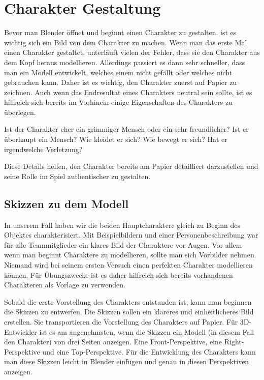 \section{Charakter Gestaltung}
Bevor man Blender öffnet und beginnt einen Charakter zu gestalten, ist es wichtig sich ein Bild von
dem Charakter zu machen. Wenn man das erste Mal einen Charakter gestaltet, unterläuft vielen der
Fehler, dass sie den Charakter aus dem Kopf heraus modellieren. Allerdings passiert es dann sehr
schneller, dass man ein Modell entwickelt, welches einem nicht gefällt oder welches nicht
gebrauchen kann. Daher ist es wichtig, den Charakter zuerst auf Papier zu zeichnen. Auch wenn das
Endresultat eines Charakters neutral sein sollte, ist es hilfreich sich bereits im Vorhinein einige
Eigenschaften des Charakters zu überlegen.

Ist der Charakter eher ein grimmiger Mensch oder ein sehr freundlicher? Ist er überhaupt ein
Mensch? Wie kleidet er sich? Wie bewegt er sich? Hat er irgendwelche Verletzung?

Diese Details helfen, den Charakter bereits am Papier detailliert darzustellen und seine Rolle im Spiel
authentischer zu gestalten.

\subsection{Skizzen zu dem Modell}

In unserem Fall haben wir die beiden Hauptcharaktere gleich zu Beginn des Objektes charakterisiert.
Mit Beispielbildern und einer Personenbeschreibung war für alle Teammitglieder ein klares Bild der
Charaktere vor Augen. Vor allem wenn man beginnt Charaktere zu modellieren, sollte man sich
Vorbilder nehmen. Niemand wird bei seinem ersten Versuch einen perfekten Charakter modellieren
können. Für Übungszwecke ist es daher hilfreich sich bereits vorhandenen Charakteren als Vorlage
zu verwenden.

Sobald die erste Vorstellung des Charakters entstanden ist, kann man beginnen die Skizzen zu
entwerfen. Die Skizzen sollen ein klareres und einheitlicheres Bild erstellen. Sie transportieren die
Vorstellung des Charakters auf Papier. Für 3D-Entwickler ist es am angenehmsten, wenn die Skizzen ein Modell
(in diesem Fall den Charakter) von drei Seiten anzeigen. Eine Front-Perspektive, eine Right-Perspektive und eine
Top-Perspektive. Für die Entwicklung des Charakters kann man diese Skizzen leicht in Blender einfügen und genau
in diesen Perspektiven anzeigen.



